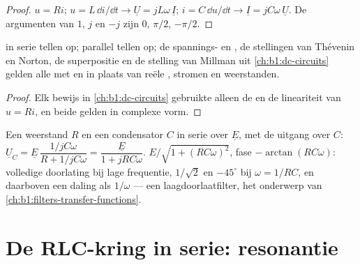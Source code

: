\begin{proof}
$u = Ri$; $u = L\,\dd i/\dd t \to \underline U = jL\omega\,\underline I$;
$i = C\,\dd u/\dd t \to \underline I = jC\omega\,\underline U$. De
argumenten van $1$, $j$ en $-j$ zijn $0$, $\pi/2$, $-\pi/2$.
\end{proof}

\begin{proposition}\label{prop:b1:sinusoidal-impedance:assoc}
 in serie tellen op;  parallel tellen op; de spannings- en
, de stellingen van Thévenin en Norton, de superpositie en
de stelling van Millman uit \cref{ch:b1:dc-circuits} gelden alle met  en  in plaats van reële , stromen en
weerstanden.
\end{proposition}

\begin{proof}
Elk bewijs in \cref{ch:b1:dc-circuits} gebruikte alleen de  en
de lineariteit van $u = Ri$, en beide gelden in complexe vorm.
\end{proof}

\begin{example}[De RC-deler]\label{ex:b1:sinusoidal-impedance:rcdivider}
Een weerstand $R$ en een condensator $C$ in serie over $\underline E$, met de
uitgang over $C$: $\underline U_C = \underline E\,\dfrac{1/jC\omega}
{R + 1/jC\omega} = \dfrac{\underline E}{1 + jRC\omega}$. 
$E/\sqrt{1 + (RC\omega)^2}$, fase $-\arctan(RC\omega)$: volledige
doorlating bij lage frequentie, $1/\sqrt2$ en $-45^\circ$ bij
$\omega = 1/RC$, en daarboven een daling als $1/\omega$ --- een laagdoorlaatfilter, het
onderwerp van \cref{ch:b1:filters-transfer-functions}.
\end{example}

\section{De RLC-kring in serie: resonantie}

